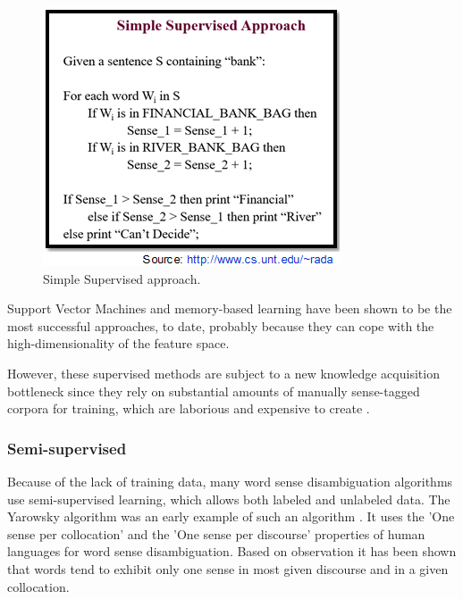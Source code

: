 \begin{figure}[tbh]
	\begin{center}
		\includegraphics[width=\columnwidth]{Union_Background_Chart_sup3}
	\end{center}
	\caption{Simple Supervised approach.}
\end{figure}

Support Vector Machines and memory-based learning have been shown to be the most successful approaches, to date, probably because they can cope with the high-dimensionality of the feature space. 

However, these supervised methods are subject to a new knowledge acquisition bottleneck since they rely on substantial amounts of manually sense-tagged corpora for training, which are laborious and expensive to create \cite{aramossoto2016onthe}.

\subsubsection*{Semi-supervised}

Because of the lack of training data, many word sense disambiguation algorithms use semi-supervised learning, which allows both labeled and unlabeled data. 
The Yarowsky algorithm was an early example of such an algorithm \cite{Gartner201317}. 
It uses the 'One sense per collocation' and the 'One sense per discourse' properties of human languages for word sense disambiguation. 
Based on observation it has been shown that words tend to exhibit only one sense in most given discourse and in a given collocation. \cite{5599823}

